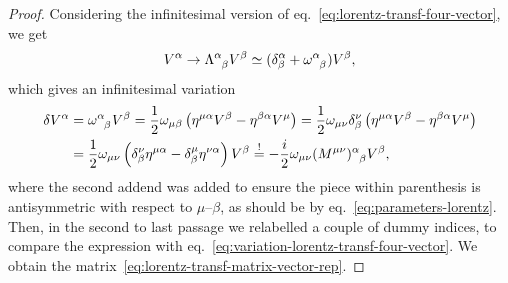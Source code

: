 \begin{proof}
    Considering the infinitesimal version of eq.~\eqref{eq:lorentz-transf-four-vector}, we get
    \begin{equation*}
        V^\alpha \to \tensor{\Lambda}{^\alpha_\beta} V^\beta \simeq (\delta^\alpha_\beta + \tensor{\omega}{^\alpha_\beta}) V^\beta,
    \end{equation*}
    which gives an infinitesimal variation
    \begin{equation*}
    \begin{split}
        \delta V^\alpha &= \tensor{\omega}{^\alpha_\beta} V^\beta = \frac{1}{2} \omega_{\mu\beta} \left( \eta^{\mu\alpha} V^\beta - \eta^{\beta\alpha} V^\mu \right) = \frac{1}{2} \omega_{\mu\nu} \delta^\nu_\beta \left( \eta^{\mu\alpha} V^\beta - \eta^{\beta\alpha} V^\mu \right) \\
        &= \frac{1}{2} \omega_{\mu\nu} \left( \delta^\nu_\beta \eta^{\mu\alpha} - \delta^\mu_\beta \eta^{\nu\alpha} \right) V^\beta \overset{!}{=} - \frac{i}{2} \omega_{\mu\nu} \tensor{(M^{\mu\nu})}{^\alpha_\beta} V^\beta ,
    \end{split}
    \end{equation*}
    where the second addend was added to ensure the piece within parenthesis is antisymmetric with respect to $\mu$--$\beta$, as should be by eq.~\eqref{eq:parameters-lorentz}. Then, in the second to last passage we relabelled a couple of dummy indices, to compare the expression with eq.~\eqref{eq:variation-lorentz-transf-four-vector}. We obtain the matrix~\eqref{eq:lorentz-transf-matrix-vector-rep}.
\end{proof}

